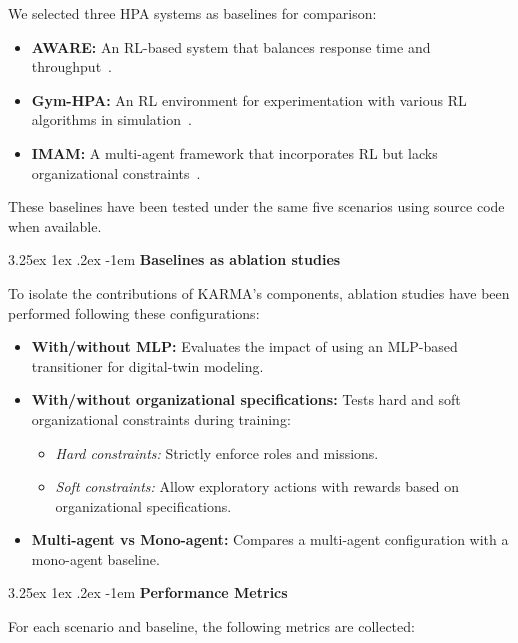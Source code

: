\documentclass[conference]{IEEEtran}
\makeatletter
\renewcommand\paragraph{\@startsection{paragraph}{5}{\z@}%
  {3.25ex \@plus1ex \@minus.2ex}%
  {-1em}%
  {\normalfont\normalsize\bfseries}}
\makeatother
\begin{document}
\noindent We selected three HPA systems as baselines for comparison:
\begin{itemize}
    \item \textbf{AWARE:} An RL-based system that balances response time and throughput~\cite{aware2023}.
    \item \textbf{Gym-HPA:} An RL environment for experimentation with various RL algorithms in simulation~\cite{gym_hpa}.
    \item \textbf{IMAM:} A multi-agent framework that incorporates RL but lacks organizational constraints~\cite{imam2022}.
\end{itemize}

These baselines have been tested under the same five scenarios using source code when available.

\paragraph{\textbf{Baselines as ablation studies}}

\noindent To isolate the contributions of KARMA's components, ablation studies have been performed following these configurations:
\begin{itemize}
    \item \textbf{With/without MLP:} Evaluates the impact of using an MLP-based transitioner for digital-twin modeling.
    \item \textbf{With/without organizational specifications:} Tests hard and soft organizational constraints during training:
        \begin{itemize}
            \item \textit{Hard constraints:} Strictly enforce roles and missions.
            \item \textit{Soft constraints:} Allow exploratory actions with rewards based on organizational specifications.
        \end{itemize}
    \item \textbf{Multi-agent vs Mono-agent:} Compares a multi-agent configuration with a mono-agent baseline.
\end{itemize}

\paragraph{\textbf{Performance Metrics}}

\noindent For each scenario and baseline, the following metrics are collected:
\end{document}
